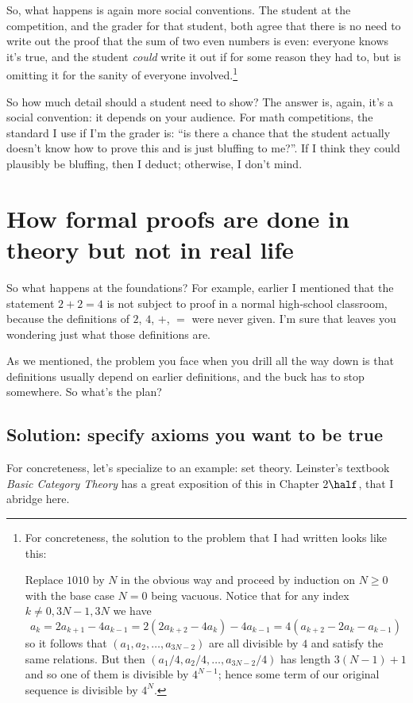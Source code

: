 \documentclass[11pt]{scrartcl}
\begin{document}
So, what happens is again more social conventions.
The student at the competition, and the grader for that student,
both agree that there is no need to write out the proof that
the sum of two even numbers is even: everyone knows it's true,
and the student \emph{could} write it out if for some reason they had to,
but is omitting it for the sanity of everyone involved.\footnote{For
concreteness, the solution to the problem that I had written looks like this:

Replace $1010$ by $N$ in the obvious way and proceed by induction on $N \ge 0$
with the base case $N = 0$ being vacuous.
Notice that for any index $k \neq 0, 3N-1, 3N$ we have
\[ a_k = 2a_{k+1} - 4a_{k-1} = 2(2a_{k+2}-4a_k)-4a_{k-1}
  = 4(a_{k+2}-2a_k-a_{k-1}) \]
so it follows that $(a_1, a_2, \dots, a_{3N-2})$
are all divisible by $4$ and satisfy the same relations.
But then $(a_1/4, a_2/4, \dots, a_{3N-2}/4)$ has length $3(N-1)+1$
and so one of them is divisible by $4^{N-1}$;
hence some term of our original sequence is divisible by $4^N$.}

So how much detail should a student need to show?
The answer is, again, it's a social convention: it depends on your audience.
For math competitions, the standard I use if I'm the grader is:
``is there a chance that the student actually doesn't know how to prove
this and is just bluffing to me?''.
If I think they could plausibly be bluffing, then I deduct;
otherwise, I don't mind.

\section{How formal proofs are done in theory but not in real life}
\label{sec:theory}

So what happens at the foundations?
For example, earlier I mentioned that the statement $2+2=4$
is not subject to proof in a normal high-school classroom,
because the definitions of $2$, $4$, $+$, $=$ were never given.
I'm sure that leaves you wondering just what those definitions are.

As we mentioned, the problem you face when you drill all the way down
is that definitions usually depend on earlier definitions,
and the buck has to stop somewhere. So what's the plan?

\subsection{Solution: specify axioms you want to be true}
For concreteness, let's specialize to an example: set theory.
Leinster's textbook \emph{Basic Category Theory} has a
great exposition of this in Chapter $2\half$, that I abridge here.
\end{document}
